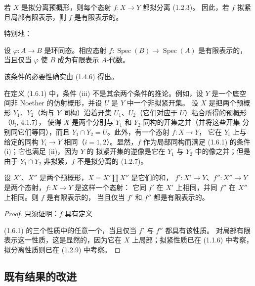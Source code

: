 若 $X$ 是拟分离预概形，则每个态射 $f:X\to Y$ 都拟分离 (1.2.3)。
因此，若 $f$ 拟紧且局部有限表示，则 $f$ 是有限表示的。

特别地：

\begin{corollary}[1.6.3]
\label{IV.1.6.3-fr}
设 $\varphi:A\to B$ 是环同态。相应态射
$f:\operatorname{Spec}(B)\to\operatorname{Spec}(A)$ 是有限表示的，
当且仅当 $\varphi$ 使 $B$ 成为有限表示 $A$-代数。
\end{corollary}

该条件的必要性确实由 (1.4.6) 得出。

\begin{remark}[1.6.4]
\label{IV.1.6.4-fr}
在定义 (1.6.1) 中，条件 (iii) 不是其余两个条件的推论。例如，设 $Y$
是一个底空间非 Noether 的仿射概形，并设 $U$ 是 $Y$ 中一个非拟紧开集。
设 $X$ 是把两个预概形 $Y_1$、$Y_2$（均与 $Y$ 同构）沿着开集
$U_1$、$U_2$（它们对应于 $U$）粘合所得的预概形（0$_{\mathrm I}$,
4.1.7），
使得 $X$ 是两个分别与 $Y_1$ 和 $Y_2$ 同构的开集之并（并将这些开集
分别同它们等同），而且 $Y_1\cap Y_2=U$。此外，有一个态射 $f:X\to Y$，
它在 $Y_i$ 上与给定的同构 $Y_i\to Y$ 相同（$i=1,2$）。显然，$f$
作为局部同构而满足 (1.6.1) 的条件 (i)；它也满足 (ii)，因为 $Y$ 的
拟紧开集的逆像是它在 $Y_1$ 与 $Y_2$ 中的像之并；但是由于
$Y_1\cap Y_2$ 非拟紧，$f$ 不是拟分离的 (1.2.7)。
\end{remark}

\begin{proposition}[1.6.5]
\label{IV.1.6.5-fr}
设 $X'$、$X''$ 是两个预概形，$X=X'\amalg X''$ 是它们的和，
$f':X'\to Y$、$f'':X''\to Y$ 是两个态射，$f:X\to Y$ 是这样一个态射：
它同 $f'$ 在 $X'$ 上相同，并同 $f''$ 在 $X''$ 上相同。则 $f$ 是有限表示的，
当且仅当 $f'$ 和 $f''$ 都是有限表示的。
\end{proposition}

\par\medskip\noindent
\begin{proof}
只须证明：$f$ 具有定义


(1.6.1) 的三个性质中的任意一个，当且仅当 $f'$ 与 $f''$ 都具有该性质。
对局部有限表示这一性质，这是显然的，因为它在 $X$ 上局部；拟紧性质已在
(1.1.6) 中考察，拟分离性质则已在 (1.2.9) 中考察。
\end{proof}

\subsection{既有结果的改进}
\label{subsection:IV.1.7-fr}

